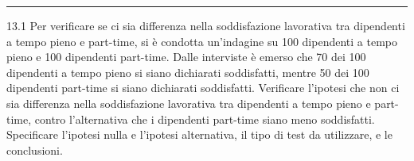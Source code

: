 \documentclass[
  11pt,
]{book}
\theoremstyle{mytheoremstyle}
\theoremstyle{mydefstyle}
\begin{document}
\begin{center}\rule{0.5\linewidth}{0.5pt}\end{center}

13.1 Per verificare se ci sia differenza nella soddisfazione lavorativa tra dipendenti a tempo pieno e part-time, si è condotta un'indagine su 100 dipendenti a tempo pieno e 100 dipendenti part-time. Dalle interviste è emerso che 70 dei 100 dipendenti a tempo pieno si siano dichiarati soddisfatti, mentre 50 dei 100 dipendenti part-time si siano dichiarati soddisfatti. Verificare l'ipotesi che non ci sia differenza nella soddisfazione lavorativa tra dipendenti a tempo pieno e part-time, contro l'alternativa che i dipendenti part-time siano meno soddisfatti. Specificare l'ipotesi nulla e l'ipotesi alternativa, il tipo di test da utilizzare, e le conclusioni.
\end{document}
